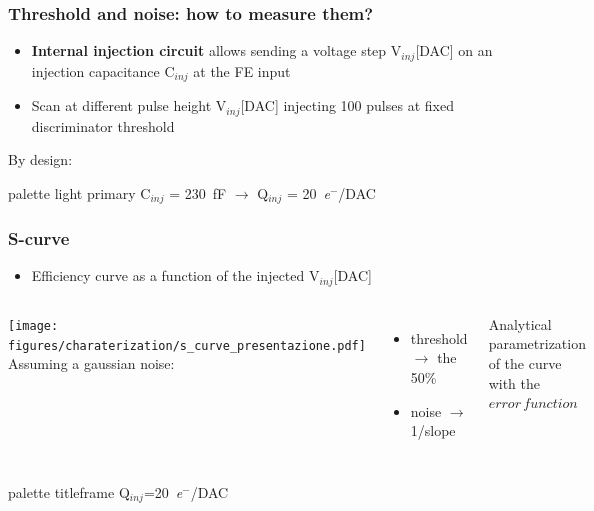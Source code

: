     \begin{frame}
        \frametitle{Threshold and noise: how to measure them?}
        \begin{itemize}
            \item\textbf{Internal injection circuit} allows sending a voltage step V$_{inj}$[DAC] on an injection capacitance C$_{inj}$ at the FE input\\\medskip
            \item Scan at different pulse height V$_{inj}$[DAC] injecting 100 pulses at fixed discriminator threshold 
        \end{itemize}
        \medskip\medskip
        By design:
        \begin{beamercolorbox}[ rounded=true, center]{palette light primary}
            C$_{inj}$ = \SI{230}{fF} $\rightarrow$ Q$_{inj}$ = \SI{20}{\elementarycharge}$^-$/DAC
        \end{beamercolorbox}  
    \end{frame}


    \begin{frame}
        \frametitle{S-curve}
        \begin{itemize}
            \item Efficiency curve as a function of the injected V$_{inj}$[DAC]
        \end{itemize}
        \medskip
        \begin{columns}
                \texttt{[image: figures/charaterization/s\_curve\_presentazione.pdf]}
                Assuming a gaussian noise:
                \begin{itemize}
                    \item threshold $\rightarrow$ the 50\%
                    \item noise $\rightarrow$ 1/slope 
                \end{itemize}
                \medskip
                Analytical parametrization of the curve with the $error\,function$\\
                
   
        \end{columns} 
        \begin{beamercolorbox}[ rounded=true, center]{palette titleframe}
            Q$_{inj}$=\SI{20}{\elementarycharge}$^-$/DAC
        \end{beamercolorbox}
    \end{frame}



